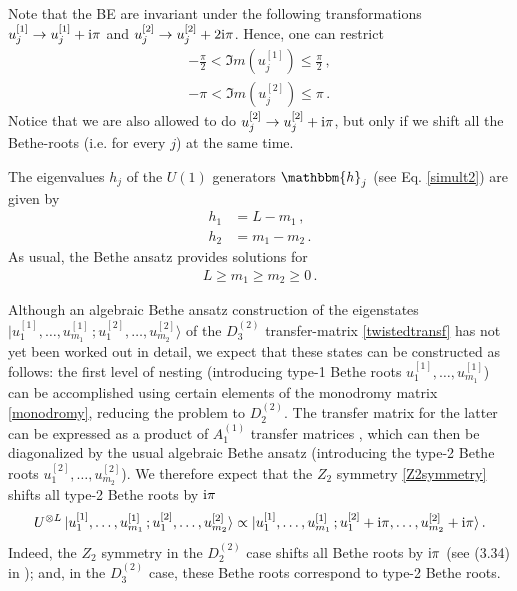 \documentclass[12pt]{article}
\numberwithin{equation}{section}
\newcommand{\BR}[2]{u^{[#1]}_{#2}}
\newcommand{\ri}{{\rm i}}
\begin{document}
	Note that the BE are invariant under the following transformations $\BR{1}{j}\to \BR{1}{j}+\ri \pi$ and $\BR{2}{j}\to \BR{2}{j}+2\ri \pi$. Hence, one can restrict 
	\begin{align}
		-\frac{\pi}{2}<\Im m(\BR{1}{j})\leq\frac{\pi}{2} \,, \\
		-\pi<\Im m(\BR{2}{j})\leq\pi \,.
	\end{align}
	Notice that we are also allowed to do $\BR{2}{j}\to \BR{2}{j}+\ri \pi $, but only if we shift all the Bethe-roots (i.e. for every $j$) at the same time.
	
	The eigenvalues $h_j$ of the $U(1)$ generators $\mathbbm{h}_j$ (see Eq. \eqref{simult2}) are given by \cite{Resh87}
	\begin{equation}
		\label{hvals}
		\begin{aligned}
			h_1&=L-m_1 \,, \\
			h_2&=m_1-m_2 \,.
		\end{aligned}
	\end{equation}
	As usual, the Bethe ansatz provides solutions for 
	\begin{align}
		L\ge m_1\ge m_2\ge0 \,.
		\label{NumBRConstraint}
	\end{align}
	
	Although an algebraic Bethe ansatz construction of the eigenstates $| u^{[1]}_1, \ldots, u^{[1]}_{m_1}\,; u^{[2]}_1, \ldots, u^{[2]}_{m_2} \rangle$ of the $D^{(2)}_3$ transfer-matrix \eqref{twistedtransf} has not yet been worked out in detail, we expect that these states can be constructed as follows: the first level of nesting (introducing type-1 Bethe roots $u^{[1]}_1, \ldots, u^{[1]}_{m_1}$) can be accomplished \cite{Mart99} using certain elements of the monodromy matrix \eqref{monodromy}, reducing the problem to $D^{(2)}_2$. The transfer matrix for the latter can be expressed as a product of $A^{(1)}_1$ transfer matrices \cite{NeRe21a}, which can then be diagonalized by the usual algebraic Bethe ansatz (introducing the type-2 Bethe roots $u^{[2]}_1, \ldots, u^{[2]}_{m_2} $). 
	We therefore expect that the $Z_2$ symmetry \eqref{Z2symmetry} shifts all type-2 Bethe roots by $\ri \pi$
	\begin{equation}
		U^{\otimes L}\, | u^{[1]}_1, \ldots, u^{[1]}_{m_1}\,; u^{[2]}_1, \ldots, u^{[2]}_{m_2} \rangle \propto | u^{[1]}_1, \ldots, u^{[1]}_{m_1}\,; u^{[2]}_1 + \ri\pi, \ldots, u^{[2]}_{m_2} + \ri\pi \rangle \,.
		\label{shiftconjecture}
	\end{equation}
	Indeed, the $Z_2$ symmetry in the $D^{(2)}_2$ case shifts all Bethe roots by $ \ri \pi$ (see (3.34) in \cite{NeRe21a}); and, in the $D^{(2)}_3$ case, these Bethe roots correspond to type-2 Bethe roots.
	
\end{document}
